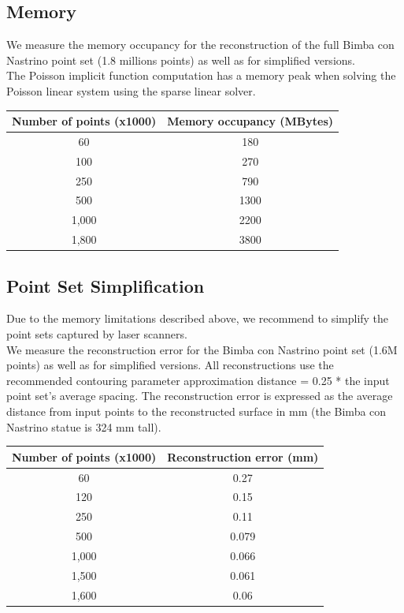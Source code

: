 \subsection{Memory}

We measure the memory occupancy for the reconstruction of the full Bimba con Nastrino point set (1.8 millions points) as well as for simplified versions.\\
The Poisson implicit function computation has a memory peak when solving the Poisson linear system using the sparse linear solver.  \\

\begin{tabular}{|c|c|}
  \hline
  Number of points (x1000) & Memory occupancy (MBytes) \\
  \hline
  60                         & 180 \\
  100                        & 270 \\
  250                        & 790 \\
  500                        & 1300 \\
  1,000                       & 2200 \\
  1,800                       & 3800 \\
  \hline
\end{tabular}



\subsection{Point Set Simplification}

Due to the memory limitations described above, we recommend to simplify the point sets captured by laser scanners.\\
We measure the reconstruction error for the Bimba con Nastrino point set (1.6M points) as well as for simplified versions. All reconstructions use the recommended contouring parameter approximation distance = 0.25 * the input point set's average spacing.
The reconstruction error is expressed as the average distance from input points to the reconstructed surface in mm (the Bimba con Nastrino statue is 324 mm tall).

\begin{tabular}{|c|c|}
  \hline
  Number of points (x1000) & Reconstruction error (mm) \\
  \hline
  60                         & 0.27 \\
  120                        & 0.15 \\
  250                        & 0.11 \\
  500                        & 0.079 \\
  1,000                       & 0.066 \\
  1,500                       & 0.061 \\
  1,600                       & 0.06 \\
  \hline
\end{tabular}

